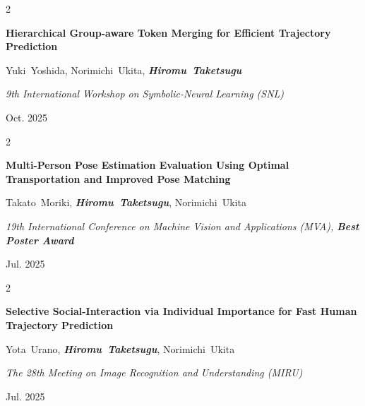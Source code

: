 \documentclass[10pt, letterpaper]{article}
\newenvironment{twocolentry}[2][]{
    \onecolentry
    \def\secondColumn{#2}
    \setcolumnwidth{\fill, 4.5 cm}
    \begin{paracol}{2}
}{
    \switchcolumn \raggedleft \secondColumn
    \end{paracol}
    \endonecolentry
} %
\begin{document}
        \vspace{0.2 cm}
        
        \begin{samepage}
            \begin{twocolentry}{
                Oct. 2025
            }
                \textbf{Hierarchical Group-aware Token Merging for Efficient Trajectory Prediction}

                \vspace{0.10 cm}

                \mbox{Yuki Yoshida}, \mbox{Norimichi Ukita}, \mbox{\textbf{\textit{Hiromu Taketsugu}}}
                \vspace{0.10 cm}

                \textit{9th International Workshop on Symbolic-Neural Learning (SNL)}
            \end{twocolentry}
        \end{samepage}
        
        \vspace{0.2 cm}

        \begin{samepage}
            \begin{twocolentry}{
                Jul. 2025
            }
                \textbf{Multi-Person Pose Estimation Evaluation Using Optimal Transportation and Improved Pose Matching}

                \vspace{0.10 cm}

                \mbox{Takato Moriki}, \mbox{\textbf{\textit{Hiromu Taketsugu}}}, \mbox{Norimichi Ukita}
                \vspace{0.10 cm}

                \textit{19th International Conference on Machine Vision and Applications (MVA), \textbf{Best Poster Award}}
            \end{twocolentry}
        \end{samepage}
        
        \vspace{0.2 cm}

        \begin{samepage}
            \begin{twocolentry}{
                Jul. 2025
            }
                \textbf{Selective Social-Interaction via Individual Importance for Fast Human Trajectory Prediction}

                \vspace{0.10 cm}

                \mbox{Yota Urano}, \mbox{\textbf{\textit{Hiromu Taketsugu}}}, \mbox{Norimichi Ukita}
                \vspace{0.10 cm}

                \textit{The 28th Meeting on Image Recognition and Understanding (MIRU)}
            \end{twocolentry}
        \end{samepage}
\end{document}
